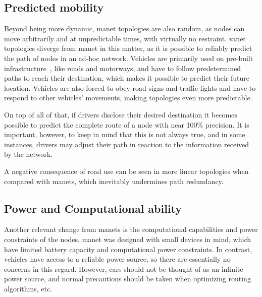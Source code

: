 \subsection{Predicted mobility}
\label{subsec:predicted_mob}

Beyond being more dynamic, \gls{manet} topologies are also random, as nodes can move arbitrarily and at unpredictable times, with virtually no restraint. \gls{vanet} topologies diverge from \gls{manet} in this matter, as it is possible to reliably predict the path of nodes in an ad-hoc network. Vehicles are primarily used on pre-built infrastructure~\cite{liang_vehicular_2015}, like roads and motorways, and have to follow predetermined paths to reach their destination, which makes it possible to predict their future location. Vehicles are also forced to obey road signs and traffic lights and have to respond to other vehicles' movements\cite{al-sultan_comprehensive_2014}, making topologies even more predictable.

On top of all of that, if drivers disclose their desired destination it becomes possible to predict the complete route of a node with near 100\% precision. It is important, however, to keep in mind that this is not always true, and in some instances, drivers may adjust their path in reaction to the information received by the network\cite{liang_vehicular_2015}.

A negative consequence of road use can be seen in more linear topologies when compared with \glspl{manet}, which inevitably undermines path redundancy\cite{toor_vehicle_2008}.

\subsection{Power and Computational ability}
\label{subsec:power_compute}

Another relevant change from \glspl{manet} is the computational capabilities and power constraints of the nodes. \gls{manet} was designed with small devices in mind, which have limited battery capacity and computational power constraints. In contrast, vehicles have access to a reliable power source\cite{liang_vehicular_2015}\cite{jakubiak_state_2008}, so there are essentially no concerns in this regard. However, cars should not be thought of as an infinite power source, and normal precautions should be taken when optimizing routing algorithms, etc.

